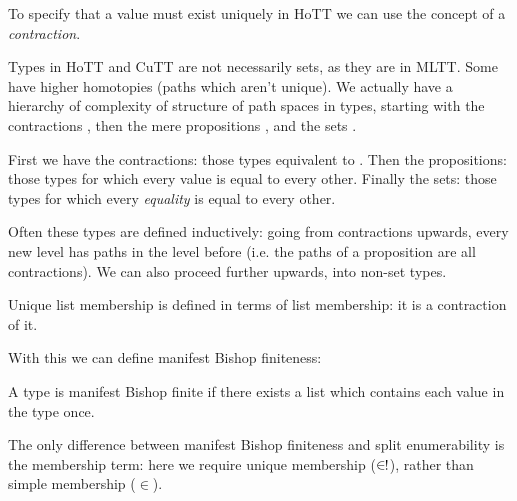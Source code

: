 To specify that a value must exist uniquely in HoTT we can use the concept of a
\emph{contraction}.

\begin{definition} \label{homotopy-types}
  Types in HoTT and CuTT are not necessarily sets, as they are in MLTT.
  Some have higher homotopies (paths which aren't unique).
  We actually have a hierarchy of complexity of structure of path spaces in
  types, starting with the contractions \cite[definition 3.11.1]{hottbook}, then
  the mere propositions \cite[definition 3.3.1]{hottbook}, and the sets
  \cite[definition 3.1.1]{hottbook}.
  \begin{agdalisting}
  \end{agdalisting}
  First we have the contractions: those types equivalent to
  \AgdaDatatype{\ensuremath{\top}}.
  Then the propositions: those types for which every value is equal to every
  other.
  Finally the sets: those types for which every \emph{equality} is equal to
  every other.

  Often these types are defined inductively: going from contractions upwards,
  every new level has paths in the level before (i.e. the paths of a proposition
  are all contractions).
  We can also proceed further upwards, into non-set types.
\end{definition}
\begin{definition} \label{uniq-memb-def}
  Unique list membership is defined in terms of list membership: it is a
  contraction of it.
  \begin{agdalisting}
  \end{agdalisting}
\end{definition}

With this we can define manifest Bishop finiteness:
\begin{definition}  \label{bish-def}
  A type is manifest Bishop finite if there exists a list which contains each
  value in the type once.
  \begin{agdalisting}
  \end{agdalisting}
\end{definition}
The only difference between manifest Bishop finiteness and split enumerability
is the membership term: here we require unique membership (\(\inunique\)),
rather than simple membership (\(\in\)).

